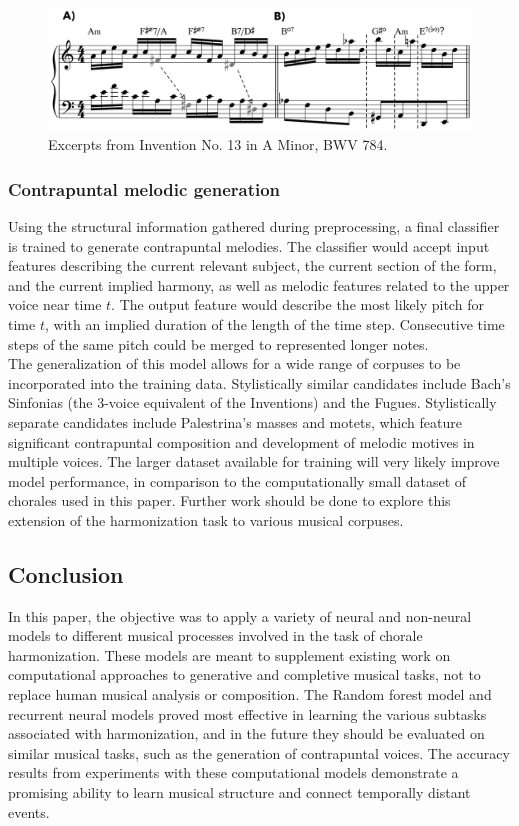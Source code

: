 \documentclass[11pt]{article}
\begin{document}
\begin{figure}[h]
\caption{ Excerpts from Invention No. 13 in A Minor, BWV 784.  }
\centerline{\includegraphics[scale=0.27]{examples/ex2}}
\end{figure}

\subsubsection{Contrapuntal melodic generation}
Using the structural information gathered during preprocessing, a final classifier is trained to generate contrapuntal melodies. The classifier would accept input features describing the current relevant subject, the current section of the form, and the current implied harmony, as well as melodic features related to the upper voice near time $t$. The output feature would describe the most likely pitch for time $t$, with an implied duration of the length of the time step. Consecutive time steps of the same pitch could be merged to represented longer notes. \\
The generalization of this model allows for a wide range of corpuses to be incorporated into the training data. Stylistically similar candidates include Bach's Sinfonias (the 3-voice equivalent of the Inventions) and the Fugues. Stylistically separate candidates include Palestrina's masses and motets, which feature significant contrapuntal composition and development of melodic motives in multiple voices. The larger dataset available for training will very likely improve model performance, in comparison to the computationally small dataset of chorales used in this paper. Further work should be done to explore this extension of the harmonization task to various musical corpuses.

\newpage

\subsection{Conclusion}

In this paper, the objective was to apply a variety of neural and non-neural models to different musical processes involved in the task of chorale harmonization. These models are meant to supplement existing work on computational approaches to generative and completive musical tasks, not to replace human musical analysis or composition. The Random forest model and recurrent neural models proved most effective in learning the various subtasks associated with harmonization, and in the future they should be evaluated on similar musical tasks, such as the generation of contrapuntal voices. The accuracy results from experiments with these computational models demonstrate a promising ability to learn musical structure and connect temporally distant events.
\end{document}
